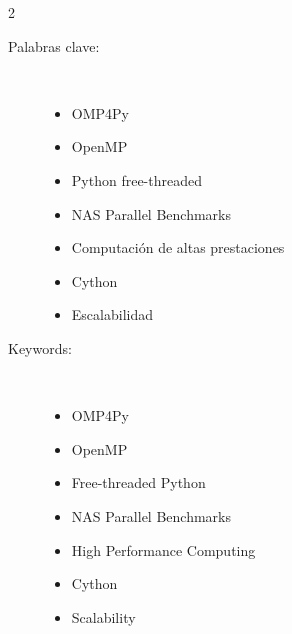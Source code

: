 \begin{multicols}{2}
\begin{description}
\item [Palabras clave:] \mbox{} \\
  \begin{itemize}
    \item OMP4Py
    \item OpenMP
    \item Python free-threaded
    \item NAS Parallel Benchmarks
    \item Computación de altas prestaciones
    \item Cython
    \item Escalabilidad
  \end{itemize}
\end{description}
\begin{description}
\item [Keywords:] \mbox{} \\
  \begin{itemize}
    \item OMP4Py
    \item OpenMP
    \item Free-threaded Python
    \item NAS Parallel Benchmarks
    \item High Performance Computing
    \item Cython
    \item Scalability
  \end{itemize}
\end{description}
\end{multicols}
